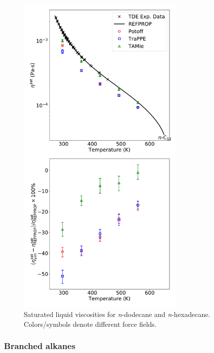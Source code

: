 \documentclass[preprint,review,12pt]{elsarticle}
\begin{document}
\begin{figure}[p!]
	\centering
	\includegraphics[width=3.2in]{compare_force_fields_C12.pdf}
	\caption{Saturated liquid viscosities for \textit{n}-dodecane and \textit{n}-hexadecane. Colors/symbols denote different force fields.}
	\label{fig:Saturation_C12_C16}
\end{figure} 

\subsubsection{Branched alkanes}


%
\end{document}
